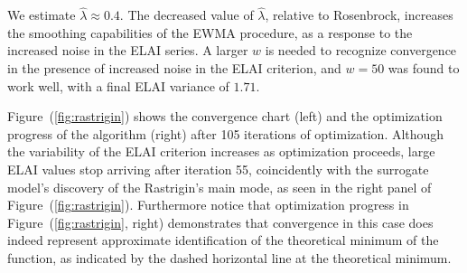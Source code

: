\documentclass{article}
\begin{document}
We estimate $\hat\lambda \approx 0.4$. The 
decreased value of $\hat\lambda$, relative to Rosenbrock, increases the 
smoothing capabilities of the EWMA procedure, as a response to the increased 
noise in the ELAI series. %
A larger $w$ is 
needed to recognize convergence in the presence of increased noise in the ELAI 
criterion, and $w=50$ was found to work well, with a final 
ELAI variance of $1.71$.

%
%

%
Figure~(\ref{fig:rastrigin}) shows the convergence chart (left) and the 
optimization progress of the algorithm (right) after 105 iterations of 
optimization. Although the variability of the ELAI criterion increases as 
optimization proceeds, large ELAI values stop arriving after iteration 55, 
coincidently with the surrogate model's discovery of the Rastrigin's main 
mode, as seen in the right panel of Figure~(\ref{fig:rastrigin}). Furthermore 
notice that optimization progress in Figure~(\ref{fig:rastrigin}, right) 
demonstrates that convergence in this case does indeed represent approximate 
identification of the theoretical minimum of the function, as indicated by the 
dashed horizontal line at the theoretical minimum. 

%
%
%

\end{document}
